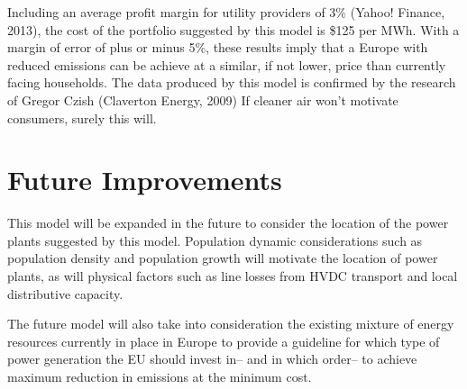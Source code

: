\documentclass{article}
\begin{document}
Including an average profit margin for utility providers of 3\% (Yahoo! Finance, 2013), the cost of the portfolio suggested by this model is \$125 per MWh. With a margin of error of plus or minus 5\%, these results imply that a Europe with reduced emissions can be achieve at a similar, if not lower, price than currently facing households. The data produced by this model is confirmed by the research of Gregor Czish (Claverton Energy, 2009) If cleaner air won't motivate consumers, surely this will. 


\section{Future Improvements}
This model will be expanded in the future to consider the location of the power plants suggested by this model. Population dynamic considerations such as population density and population growth will motivate the location of power plants, as will physical factors such as line losses from HVDC transport and local distributive capacity. \*

The future model will also take into consideration the existing mixture of energy resources currently in place in Europe to provide a guideline for which type of power generation the EU should invest in-- and in which order-- to achieve maximum reduction in emissions at the minimum cost. 





\newpage
\end{document}
